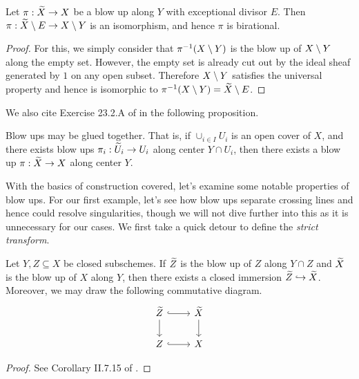 \begin{corollary}
    Let $\pi: \widetilde X \to X$ be a blow up along $Y$ with exceptional divisor $E$.
    Then $\pi : \widetilde X \setminus E \to X \setminus Y$ is an isomorphism,
    and hence $\pi$ is birational.
\end{corollary}

\begin{proof}
    For this, we simply consider that $\pi^{-1}(X \setminus Y)$ is the blow up of $X \setminus Y$ along the empty set.
    However, the empty set is already cut out by the ideal sheaf generated by $1$ on any open subset. 
    Therefore $X \setminus Y$ satisfies the universal property and hence is isomorphic to $\pi^{-1}(X \setminus Y) = \widetilde X \setminus E$.
\end{proof}

We also cite Exercise 23.2.A of \cite{Vakil_2022} in the following proposition.

\begin{proposition}
    Blow ups may be glued together.
    That is, if $\cup_{i \in I} U_i$ is an open cover of $X$,
    and there exists blow ups $\pi_i : \widetilde U_i \to U_i$ along center $Y \cap U_i$,
    then there exists a blow up $\pi : \widetilde X \to X$ along center $Y$.
\end{proposition}

With the basics of construction covered, 
let's examine some notable properties of blow ups.
For our first example, let's see how blow ups separate crossing lines and hence could resolve singularities, 
though we will not dive further into this as it is unnecessary for our cases.
We first take a quick detour to define the \textit{strict transform}.

\begin{lemma}
    Let $Y, Z \subseteq X$ be closed subschemes.
    If $\widetilde Z$ is the blow up of $Z$ along $Y \cap Z$ and $\widetilde X$ is the blow up of $X$ along $Y$,
    then there exists a closed immersion $\widetilde Z \hookrightarrow \widetilde X$.
    Moreover, we may draw the following commutative diagram.
    \[
        \begin{tikzcd}
            \wt Z \arrow[r, hook] \arrow[d] & \wt X \arrow[d] \\
            Z \arrow[r, hook] & X
        \end{tikzcd}
    \]
\end{lemma}

\begin{proof}
    See Corollary II.7.15 of \cite{Hartshorne_2013}.
\end{proof}

